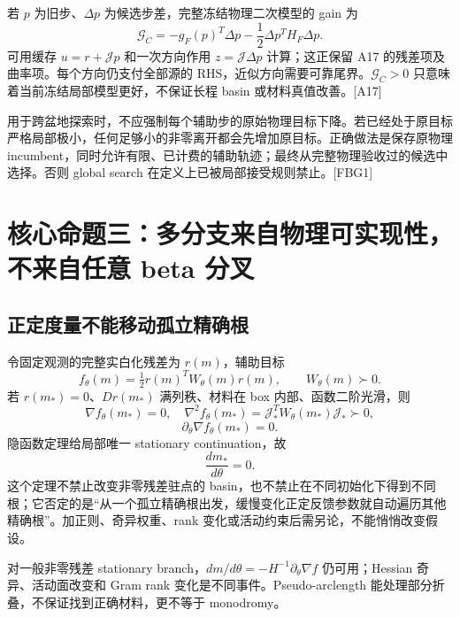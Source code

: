 \documentclass[10pt,a4paper]{article}
\begin{document}
若 \(p\) 为旧步、\(\Delta p\) 为候选步差，完整冻结物理二次模型的 gain 为
\[\mathcal G_C=-g_F(p)^T\Delta p-\frac12\Delta p^TH_F\Delta p.\]
可用缓存 \(u=r+\mathcal Jp\) 和一次方向作用 \(z=\mathcal J\Delta p\)
计算；这正保留 A17 的残差项及曲率项。每个方向仍支付全部源的
RHS，近似方向需要可靠尾界。\(\mathcal G_C>0\)
只意味着当前冻结局部模型更好，不保证长程 basin 或材料真值改善。{[}A17{]}

用于跨盆地探索时，不应强制每个辅助步的原始物理目标下降。若已经处于原目标严格局部极小，任何足够小的非零离开都会先增加原目标。正确做法是保存原物理
incumbent，同时允许有限、已计费的辅助轨迹；最终从完整物理验收过的候选中选择。否则
global search 在定义上已被局部接受规则禁止。{[}FBG1{]}

\hypertarget{ux6838ux5fc3ux547dux9898ux4e09ux591aux5206ux652fux6765ux81eaux7269ux7406ux53efux5b9eux73b0ux6027ux4e0dux6765ux81eaux4efbux610f-beta-ux5206ux53c9}{%
\section{核心命题三：多分支来自物理可实现性，不来自任意 beta
分叉}\label{ux6838ux5fc3ux547dux9898ux4e09ux591aux5206ux652fux6765ux81eaux7269ux7406ux53efux5b9eux73b0ux6027ux4e0dux6765ux81eaux4efbux610f-beta-ux5206ux53c9}}

\hypertarget{ux6b63ux5b9aux5ea6ux91cfux4e0dux80fdux79fbux52a8ux5b64ux7acbux7cbeux786eux6839}{%
\subsection{正定度量不能移动孤立精确根}\label{ux6b63ux5b9aux5ea6ux91cfux4e0dux80fdux79fbux52a8ux5b64ux7acbux7cbeux786eux6839}}

令固定观测的完整实白化残差为 \(r(m)\)，辅助目标
\[f_\theta(m)=\tfrac12r(m)^TW_\theta(m)r(m),\qquad W_\theta(m)\succ0.\]
若 \(r(m_*)=0\)、\(Dr(m_*)\) 满列秩、材料在 box 内部、函数二阶光滑，则
\[\nabla f_\theta(m_*)=0,\quad
\nabla^2f_\theta(m_*)=\mathcal J_*^TW_\theta(m_*)\mathcal J_*\succ0,\]
\[\partial_\theta\nabla f_\theta(m_*)=0.\] 隐函数定理给局部唯一
stationary continuation，故 \[\boxed{\frac{dm_*}{d\theta}=0.}\]
这个定理不禁止改变非零残差驻点的
basin，也不禁止在不同初始化下得到不同根；它否定的是``从一个孤立精确根出发，缓慢变化正定反馈参数就自动遍历其他精确根''。加正则、奇异权重、rank
变化或活动约束后需另论，不能悄悄改变假设。

对一般非零残差 stationary
branch，\(dm/d\theta=-H^{-1}\partial_\theta\nabla f\) 仍可用；Hessian
奇异、活动面改变和 Gram rank 变化是不同事件。Pseudo-arclength
能处理部分折叠，不保证找到正确材料，更不等于 monodromy。
\end{document}

